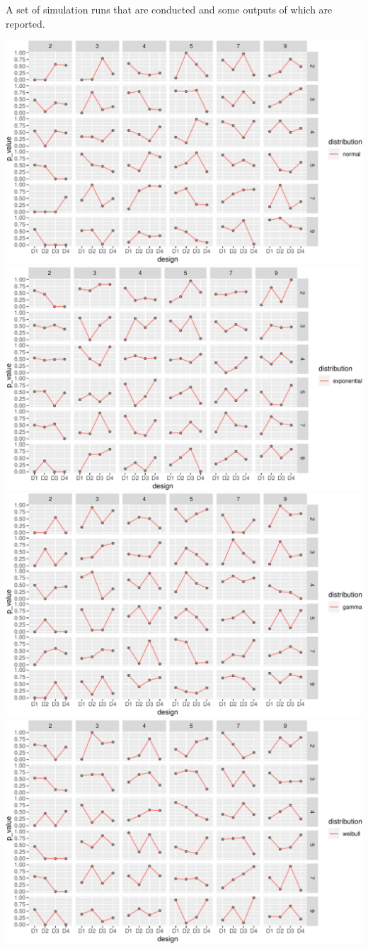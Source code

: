 \documentclass[
]{article}
\begin{document}
A set of simulation runs that are conducted and some outputs of which are reported.

\begin{center}\includegraphics[width=\textwidth]{figure/sim_all-1} \includegraphics[width=\textwidth]{figure/sim_all-2} \includegraphics[width=\textwidth]{figure/sim_all-3} \includegraphics[width=\textwidth]{figure/sim_all-4} \end{center}
\end{document}
